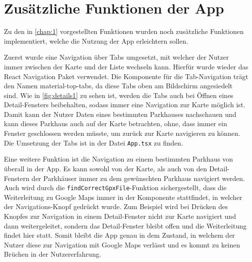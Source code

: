 \chapter{Zusätzliche Funktionen der App}
\label{chap:6}

Zu den in \autoref{chap:1} vorgestellten Funktionen wurden noch zusätzliche Funktionen implementiert, welche die Nutzung der App erleichtern sollen.

Zuerst wurde eine Navigation über Tabs umgesetzt, mit welcher der Nutzer immer zwischen der Karte und der Liste wechseln kann. Hierfür wurde wieder das React Navigation Paket \cite{reactNavigation} verwendet. Die Komponente für die Tab-Navigation trägt den Namen material-top-tabs, da diese Tabs oben am Bildschirm angesiedelt sind. Wie in \autoref{fig:details1} zu sehen ist, werden die Tabs auch bei Öffnen eines Detail-Fensters beibehalten, sodass immer eine Navigation zur Karte möglich ist. Damit kann der Nutzer Daten eines bestimmten Parkhauses nachschauen und kann dieses Parkhaus auch auf der Karte betrachten, ohne, dass immer ein Fenster geschlossen werden müsste, um zurück zur Karte navigieren zu können. Die Umsetzung der Tabs ist in der Datei \verb|App.tsx| zu finden.

Eine weitere Funktion ist die Navigation zu einem bestimmten Parkhaus von überall in der App. Es kann sowohl von der Karte, als auch von den Detail-Fenstern der Parkhäuser immer zu dem gewünschten Parkhaus navigiert werden. Auch wird durch die \verb|findCorrectGpxFile|-Funktion sichergestellt, dass die Weiterleitung zu Google Maps immer in der Komponente stattfindet, in welcher der Navigations-Knopf gedrückt wurde. Zum Beispiel wird bei Drücken des Knopfes zur Navigation in einem Detail-Fenster nicht zur Karte navigiert und dann weitergeleitet, sondern das Detail-Fenster bleibt offen und die Weiterleitung findet hier statt. Somit bleibt die App genau in dem Zustand, in welchem der Nutzer diese zur Navigation mit Google Maps verlässt und es kommt zu keinen Brüchen in der Nutzererfahrung.


